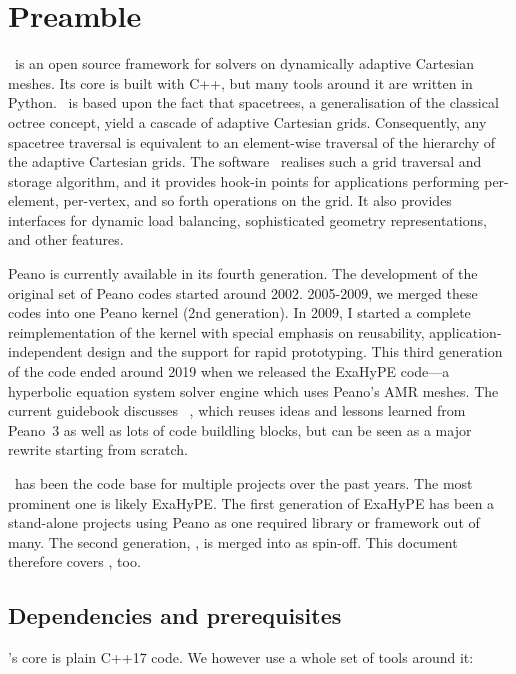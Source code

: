 \chapter{Preamble}


\Peano\ is an open source framework for solvers on dynamically adaptive
Cartesian meshes.
Its core is built with C++, but many tools around it are written in Python.
\Peano\  is based upon the fact that spacetrees, a generalisation of the
classical octree concept, yield a cascade of adaptive Cartesian grids.
Consequently, any spacetree traversal is equivalent to an element-wise
traversal of the hierarchy of the adaptive Cartesian grids. The software
\Peano\  realises such a grid traversal and storage algorithm, and it provides
hook-in points for applications performing per-element, per-vertex, and so
forth operations on the grid. It also provides interfaces for dynamic load
balancing, sophisticated geometry representations, and other features.


Peano is currently available in its fourth generation. 
The development of the original set of Peano codes started around 2002.
2005-2009, we merged these codes into one Peano kernel (2nd generation). 
In 2009, I started a complete reimplementation of the kernel with special
emphasis on reusability, application-independent design and the support for rapid prototyping. 
This third generation of the code ended around 2019 when we released the
ExaHyPE code---a hyperbolic equation system solver engine which uses Peano's
AMR meshes.
The current guidebook discusses \Peano\ , which reuses ideas and lessons learned
from Peano~3 as well as lots of code buildling blocks, but can be seen as a
major rewrite starting from scratch.



\Peano\ has been the code base for multiple projects over the past years.
The most prominent one is likely ExaHyPE.
The first generation of ExaHyPE has been a stand-alone projects using Peano
as one required library or framework out of many.
The second generation, \ExaHyPE, is merged into \Peano as spin-off.
This document therefore covers \ExaHyPE, too.




\section*{Dependencies and prerequisites}

\Peano's core is plain C++17 code. 
We however use a whole set of tools around it:

